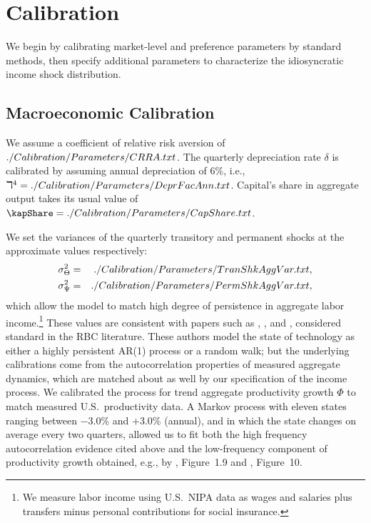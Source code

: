 \documentclass[titlepage]{\econtex}\newcommand{\texname}{cAndCwithStickyE}
\begin{document}
\section{Calibration}\label{sec:calibration}

We begin by calibrating market-level and preference parameters by standard methods, then specify additional parameters to characterize the idiosyncratic income shock distribution.

\subsection{Macroeconomic Calibration}
\label{sec:MacroCal}

We assume a coefficient of relative risk aversion of
$
 ./Calibration/Parameters/CRRA.txt
$. %
The quarterly depreciation rate $\delta$ is calibrated by assuming annual depreciation of 6\%,
i.e.,
$
\daleth^{4}=  ./Calibration/Parameters/DeprFacAnn.txt
$.  Capital's share in aggregate output takes its usual value of
$
\kapShare=  \ParmDir/CapShare.txt
$.

We set the variances of the quarterly transitory and permanent shocks at the approximate values respectively:
\begin{eqnarray*}
   \sigma^{2}_{\Theta} & = &  ./Calibration/Parameters/TranShkAggVar.txt ,
\\ \sigma^{2}_{\Psi}  & =  &  ./Calibration/Parameters/PermShkAggVar.txt ,
\end{eqnarray*}
which allow the model to match high degree of persistence in aggregate labor income.\footnote{We measure labor income using U.S.\ NIPA data as wages and salaries plus transfers minus personal contributions for social insurance.} These values are consistent with papers such as \cite{jermannProduction}, \cite{bcfHabits}, and \cite{ckmCritique}, considered standard  in the RBC literature. These authors model the state of technology as either a highly persistent AR(1) process or a random walk; but the underlying calibrations come from the autocorrelation properties of measured aggregate dynamics, which are matched about as well by our specification of the income process.  We calibrated the process for trend aggregate productivity growth $\Phi$ to match measured U.S.\ productivity data.  A Markov process with eleven states ranging between $-3.0\%$ and $+3.0\%$ (annual), and in which the state changes on average every two quarters, allowed us to fit both the high frequency autocorrelation evidence cited above and the low-frequency component of productivity growth obtained, e.g., by \cite{sswNAIRU}, Figure~1.9 and \cite{fernald:disappointingRecovery}, Figure~10.
\end{document}
